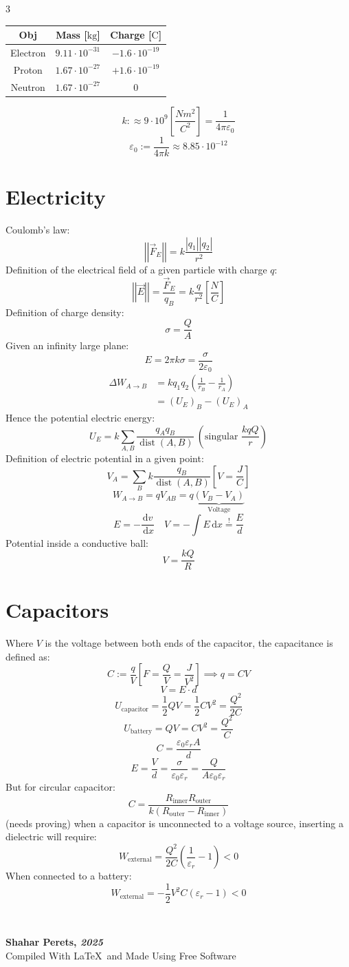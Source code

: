 \documentclass[]{article}
\newcommand\ndoc  {\dotfill \\ \vfil {\begin{center}
            {\textbf{Shahar Perets, \textit{2025}} \\
                \scriptsize {Compiled With \LaTeX \, and Made Using Free Software}}
    \end{center}} \vfil	}
\newcommand\seq   {\overset{!}{=}}
\newcommand\dx    {\,\mathrm{d}x}
\newcommand\md    {\mathrm{d}}
\newcommand\eg        {\varepsilon}
\newcommand\sg        {\sigma}
\newcommand\sof[1]    {\left | #1 \right |}
\newcommand\cl [1]    {\left ( #1 \right )}
\newcommand\csb[1]    {\left [ #1 \right ]}
\newcommand\norm[1]   {\left \vert \left \vert #1 \right \vert \right \vert}
\DeclareMathOperator{\dist}{dist}
\begin{document}
	\begin{multicols}{3}
		\begin{center}
			\begin{tabular}{|c|c|c|}
				\hline Obj & Mass [$\mathrm{kg}$] & Charge [$\mathrm{C}$] \\
				\hline Electron & $9.11 \cdot 10^{-31}$ & $-1.6 \cdot 10^{-19}$ \\
				\hline Proton & $1.67 \cdot 10^{-27}$ & $+1.6 \cdot 10^{-19}$ \\
				\hline Neutron & $1.67 \cdot 10^{-27}$ & $0$ \\
				\hline
			\end{tabular}
		\end{center}
		\[ k :\approx 9 \cdot 10^{9}\csb{\frac{Nm^{2}}{C^{2}}} = \frac{1}{4 \pi \eg_0} \]
		\[ \eg_0 := \frac{1}{4\pi k} \approx 8.85 \cdot 10^{-12} \]
		\section{Electricity}
		Coulomb's law: 
		\[ \norm{\vec F_E} = k \frac{\sof{q_1} \sof{q_2}}{r^{2}} \]
		Definition of the electrical field of a given particle with charge $q$: 
		\[ \norm{\vec E} = \frac{\vec F_E}{q_B} = k\frac{q}{r^{2}} \csb{\frac{N}{C}} \]
		Definition of charge density: 
		\[ \sg = \frac{Q}{A} \]
		Given an infinity large plane: 
		\[ E = 2\pi k \sg = \frac{\sg}{2\eg_0} \]
		\begin{align*}
			\Delta W_{A \to B} &= kq_1q_2 \cl{\frac{1}{r_B} - \frac{1}{r_A}} \\
			&= (U_E)_B - (U_E)_A
		\end{align*}
		Hence the potential electric energy: 
		\[ U_E = k \sum_{A, B} \frac{q_Aq_B}{\dist(A, B)} \ \cl{\text{singular }\frac{kqQ}{r}} \]
		Definition of electric potential in a given point: 
		\[ V_A = \sum_B k\frac{q_B}{\dist(A, B)} \csb{V = \frac{J}{C}} \]
		\[ W_{A \to B} = qV_{AB} = q\underbrace{(V_B - V_A)}_{\text{Voltage}} \]
		\[ E = -\frac{\md v}{\dx} \quad V = -\int E\dx \seq \frac{E}{d} \]
		Potential inside a conductive ball: 
		\[ V = \frac{kQ}{R} \]
		
		\section{Capacitors}
		Where $V$ is the voltage between both ends of the capacitor, the capacitance is defined as: 
		\[ C:= \frac{q}{V}\csb{F = \frac{Q}{V} = \frac{J}{V^{2}}} \implies q = CV \]
		\[ V = E \cdot d \]
		\[ U_{\text{capacitor}} = \frac{1}{2}QV = \frac{1}{2}CV^2 = \frac{Q^2}{2C} \]
		\[ U_{\text{battery}} = QV = CV^2 = \frac{Q^2}{C} \]
		\[ C = \frac{\eg_0 \eg_r A}{d} \]
		\[ E = \frac{V}{d} = \frac{\sg}{\eg_0 \eg_r} = \frac{Q}{A \eg_0 \eg_r} \]
		But for circular capacitor: 
		\[ C = \frac{R_{\text{inner}}R_{\text{outer}}}{k(R_\text{outer} - R_\text{inner})} \]
		(needs proving) when a capacitor is unconnected to a voltage source, inserting a dielectric will require: 
		\[ W_{\text{external}} = \frac{Q^{2}}{2C}\cl{\frac{1}{\eg_r} - 1}< 0 \]
		When connected to a battery: 
		\[ W_{\text{external}} = -\frac{1}{2}V^{2}C\cl{\eg_r - 1} < 0 \]
		
		
	\end{multicols}
	
	\ndoc
	
\end{document}
